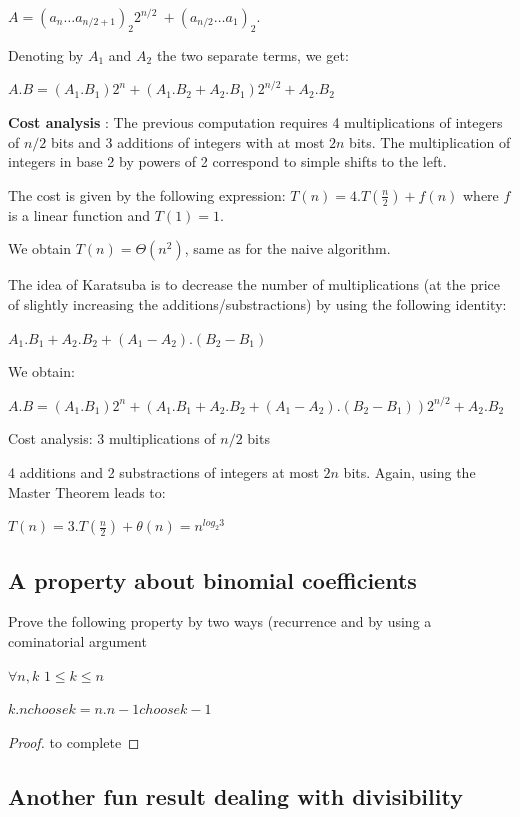 $A=(a_n\ldots a_{n/2+1})_2 2^{n/2}\ + (a_{n/2}\ldots a_1)_2$.

Denoting by $A_1$ and $A_2$ the two separate terms, we get:

$A.B = (A_1.B_1) 2^n + (A_1.B_2 + A_2.B_1) 2^{n/2} + A_2.B_2$
\bigskip

\textbf{Cost analysis} :
The previous computation requires 4 multiplications of integers of $n/2$ bits 
and 3 additions of integers with at most $2n$ bits. The multiplication of integers in base 2 by powers of 2 
correspond to simple shifts to the left. 

The cost is given by the following expression: $T(n) = 4.T(\frac{n}{2}) + f(n)$ where $f$ is a linear function
and $T(1) = 1$.

We obtain $T(n) = \Theta(n^2)$, same as for the naive algorithm.
\bigskip
 

The idea of Karatsuba is to decrease the number of multiplications 
(at the price of slightly increasing the additions/substractions) by using the following identity:

$A_1.B_1 + A_2.B_2 + (A_1-A_2).(B_2-B_1)$
\bigskip

We obtain:

$A.B = (A_1.B_1) 2^n + (A_1.B_1 + A_2.B_2 + (A_1-A_2).(B_2-B_1)) 2^{n/2} + A_2.B_2$


Cost analysis: 3 multiplications of $n/2$ bits

4 additions and 2 substractions of integers at most $2n$ bits. Again, using the Master Theorem leads to:

$T(n) = 3.T(\frac{n}{2}) + \theta (n) = n^{log_2 3}$


\subsection{A property about binomial coefficients}

Prove the following property by two ways (recurrence and by using a cominatorial argument
\begin{prop}
$\forall n,k$ $1 \leq k \leq n$

$k.{n choose k} = n.{{n-1} choose {k-1}}$
\end{prop}

\begin{proof}
to complete
\end{proof}



\subsection{Another fun result dealing with divisibility}

